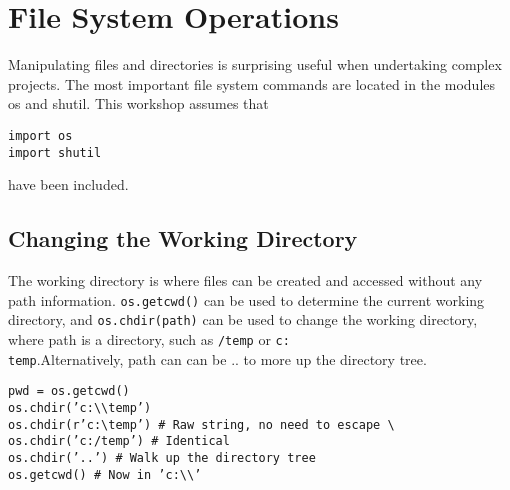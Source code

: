 \documentclass[KSmain.tex]{subfiles}
\begin{document}
 
\newpage
\section{File System Operations}
Manipulating files and directories is surprising useful when undertaking complex projects. The most important
file system commands are located in the modules os and shutil. This workshop assumes that
\begin{framed}
\begin{verbatim}
import os
import shutil
\end{verbatim}
\end{framed}
have been included.
\subsection{Changing the Working Directory}
The working directory is where files can be created and accessed without any path information. \texttt{os.getcwd()}
can be used to determine the current working directory, and \texttt{os.chdir(path)} can be used to change the
working directory, where path is a directory, such as \texttt{/temp} or \texttt{c:\\temp}.Alternatively, path can can be .. to
more up the directory tree.
\begin{framed}
\begin{verbatim}
pwd = os.getcwd()
os.chdir(’c:\\temp’)
os.chdir(r’c:\temp’) # Raw string, no need to escape \
os.chdir(’c:/temp’) # Identical
os.chdir(’..’) # Walk up the directory tree
os.getcwd() # Now in ’c:\\’
\end{verbatim}
\end{framed}
\end{document}
